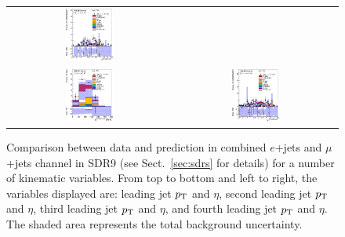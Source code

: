 \begin{figure}[htbp]
\begin{center}
\begin{tabular}{cc}
\includegraphics[width=0.30\textwidth]{appendices/figures/sdrs/JetEta3_ELEMUONCR9_1W_NOMINAL.eps} \\
\includegraphics[width=0.30\textwidth]{appendices/figures/sdrs/JetPt4_ELEMUONCR9_1W_NOMINAL.eps}  &
\includegraphics[width=0.30\textwidth]{appendices/figures/sdrs/JetEta4_ELEMUONCR9_1W_NOMINAL.eps}  \\
\end{tabular}\caption{\small {Comparison between data and prediction in combined $e$+jets and $\mu$+jets channel in SDR9 (see Sect.~\ref{sec:sdrs} for details) 
for a number of kinematic variables. From top to bottom and left to right, the variables displayed are: leading jet $\pt$ and $\eta$,  second leading jet $\pt$ and $\eta$,
third leading jet $\pt$ and $\eta$, and fourth leading jet $\pt$ and $\eta$. The shaded area represents the total background uncertainty.}}
\label{fig:ELEMUONCR9_2}
\end{center}
\end{figure}                                                                             

